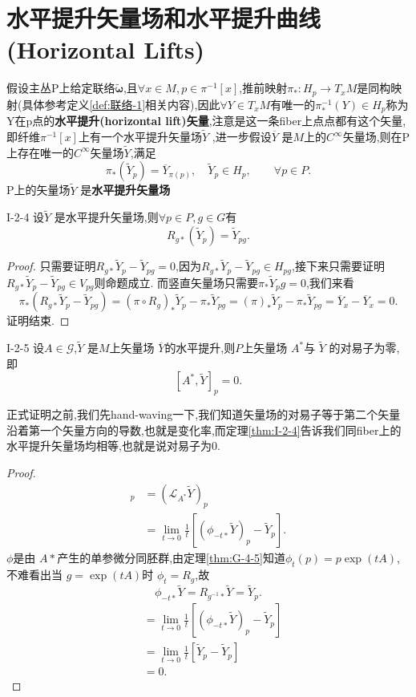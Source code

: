 \documentclass[../main.tex]{subfiles}
\begin{document}
\section{水平提升矢量场和水平提升曲线(Horizontal Lifts)}
假设主丛P上给定联络$\bm{\tilde{\omega}}$,且$\forall x \in M, p \in \pi^{-1}[x]$,推前映射$\pi_* : H_p \to T_xM$是同构映射(具体参考定义\ref{def:联络-1}相关内容),因此$\forall Y \in T_xM$有唯一的$\pi^{-1}_*(Y) \in H_p$称为Y在p点的\textbf{水平提升(horizontal lift)矢量},注意是这一条fiber上点点都有这个矢量,即纤维$\pi^{-1}[x]$上有一个水平提升矢量场$\tilde{Y}$
,进一步假设$\overline{Y}$ 是$M$上的$C^\infty$矢量场,则在P上存在唯一的$C^\infty$矢量场$\tilde{Y}$,满足\[
  \pi_*(\tilde{Y}_p) = \overline{Y}_{\pi(p)}, \quad \tilde{Y}_p \in H_p , \qquad \forall  p \in  P 
.\]P上的矢量场$\tilde{Y}$ 是\textbf{水平提升矢量场}
\begin{theorem}
  {}{I-2-4}
  设$\tilde{Y}$ 是水平提升矢量场,则$\forall p \in P, g \in  G$有\[
    R_{g*}(\tilde{Y}_p) = \tilde{Y}_{pg} 
  .\] 
\end{theorem}
\begin{proof}
  只需要证明$R_{g*}\tilde{Y}_p - \tilde{Y}_{pg} = 0$,因为$R_{g*}\tilde{Y}_p - \tilde{Y}_{pg}\in H_{pg}$,接下来只需要证明$R_{g*}\tilde{Y}_p - \tilde{Y}_{pg} \in  V_{pg}$则命题成立.
  而竖直矢量场只需要$\pi_{*}\tilde{Y}_pg = 0$,我们来看\[
    \pi_{*}(R_{g*}\tilde{Y}_p - \tilde{Y}_{pg}) =  (\pi\circ R_g)_* \tilde{Y}_p - \pi_*\tilde{Y}_{pg} =(\pi)_* \tilde{Y}_p - \pi_*\tilde{Y}_{pg} = \overline{Y}_{x} - \overline{Y}_{x} = 0
  .\] 
  证明结束.
\end{proof}
\begin{theorem}
  {}{I-2-5}
  设$A \in \mathscr{G}$,$\tilde{Y}$ 是$M$上矢量场 $\overline{Y}$的水平提升,则$P$上矢量场 $A^*$与 $\tilde{Y}$ 的对易子为零,即\[
    [A^*, \tilde{Y}]_p = 0 
  .\] 
\end{theorem}
\begin{note}
  正式证明之前,我们先hand-waving一下,我们知道矢量场的对易子等于第二个矢量沿着第一个矢量方向的导数,也就是变化率,而定理\ref{thm:I-2-4}告诉我们同fiber上的水平提升矢量场均相等,也就是说对易子为0.
\end{note}
\begin{proof}
  \begin{align*}
    [A^*,\tilde{Y}]_p &= (\mathscr{L}_{A^*} \tilde{Y})_p\\
                      & = \lim_{t \to 0} \frac{1}{t}[(\phi_{-t*}\tilde{Y})_p - \tilde{Y}_p]
  .\end{align*}
  $\phi$是由 $A*$产生的单参微分同胚群,由定理\ref{thm:G-4-5}知道$\phi_t(p) = p\exp(tA)$,不难看出当 $g = \exp(tA)$时 $\phi_t = R_g$,故 \[
    \phi_{-t*}\tilde{Y} = R_{g^{-1}*}\tilde{Y} = \tilde{Y}_p
  .\] 
  \begin{align*}
    [ A^*,\tilde{Y}_p] & = \lim_{t \to 0} \frac{1}{t}[(\phi_{-t*}\tilde{Y})_p - \tilde{Y}_p]\\
                      & = \lim_{t \to 0} \frac{1}{t}[\tilde{Y}_p - \tilde{Y}_p]\\
                      & = 0
  .\end{align*}
\end{proof}
\end{document}
